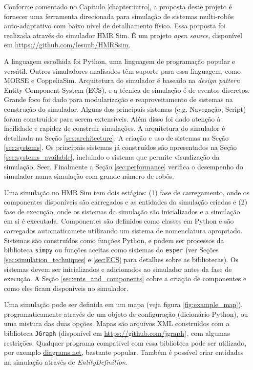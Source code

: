 \label{chapter:hmr_sim}

Conforme comentado no Capítulo \ref{chapter:intro}, a proposta deste projeto é fornecer uma ferramenta direcionada para simulação de sistemas multi-robôs auto-adaptativo com baixo nível de detalhamento físico. Essa porposta foi realizada através do simulador HMR Sim. É um projeto \textit{open source}, disponível em \url{https://github.com/lesunb/HMRSsim}.

A linguagem escolhida foi Python, uma linguagem de programação popular e versátil. Outros simuladores analisados têm suporte para essa linguagem, como MORSE e CoppeliaSim. Arquitetura do simulador é baseado na \textit{design pattern} Entity-Component-System (ECS), e a técnica de simulação é de eventos discretos. Grande foco foi dado para modularização e reaproveitamento de sistemas na construção do simulador. Alguns dos principais sistemas (e.g. Navegação, Script) foram construídos para serem extensíveis. Além disso foi dado atenção à facilidade e rapidez de construir simulações. A arquitetura do simulador é detalhada na Seção \ref{sec:architecture}. A criação e uso de sistemas na Seção \ref{sec:systems}. Os principais sistemas já construídos são apresentados na Seção \ref{sec:systems_available}, incluindo o sistema que permite visualização da simulação, Seer. Finalmente a Seção \ref{sec:performance} verifica o desempenho do simulador numa simulação com grande número de robôs.

Uma simulação no HMR Sim tem dois estágios: (1) fase de carregamento, onde os componentes disponíveis são carregados e as entidades da simulação criadas e (2) fase de execução, onde os sistemas da simulação são inicializados e a simulação em si é executada. Componentes são definidos como classes em Python e são carregados automaticamete utilizando um sistema de nomenclatura apropriado. Sistemas são construídos como funções Python, e podem ser processos da biblioteca \texttt{simpy} ou funções aceitas como sistemas do \texttt{esper} (ver Seções \ref{sec:simulation_techniques} e \ref{sec:ECS} para detalhes sobre as bibliotecas). Os sistemas devem ser inicializados e adicionados ao simulador antes da fase de execução. A Seção \ref{sec:ents_and_components} cobre a criação de componentes e como eles ficam disponíveis no simulador.

Uma simulação pode ser definida em um mapa (veja figura \ref{fig:example_map}), programaticamente através de um objeto de configuração (dicionário Python), ou uma mistura das duas opções. Mapas são arquivos XML construídos com a biblioteca \texttt{JGraph} (disponível em \url{https://github.com/jgraph}), com algumas restrições. Qualquer programa compatível com essa biblioteca pode ser utilizado, por exemplo \url{diagrams.net}, bastante popular. Também é possível criar entidades na simulação através de \textit{EntityDefinition}.

